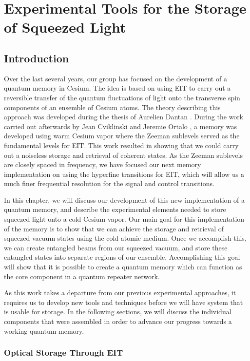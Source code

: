 \chapter{Experimental Tools for the Storage of Squeezed Light}
\minitoc

 
\section{Introduction}

Over the last several years, our group has focused on the development of a quantum memory in Cesium.  The idea is based on using EIT to carry out a reversible transfer of the quantum fluctuations of light onto the transverse spin components of an ensemble of Cesium atoms.  The theory describing this approach was developed during the thesis of Aurelien Dantan \cite{DantanPhD}.  During the work carried out afterwards by Jean Cviklinski \cite{CviklinskiPhD} and Jeremie Ortalo \cite{ortalo}, a memory was developed using warm Cesium vapor where the Zeeman sublevels served as the fundamental levels for EIT.  This work resulted in showing that we could carry out a noiseless storage and retrieval of coherent states.  As the Zeeman sublevels are closely spaced in frequency, we have focused our next memory implementation on using the hyperfine transitions for EIT, which will allow us a much finer frequential resolution for the signal and control transitions.

In this chapter, we will discuss our development of this new implementation of
a quantum memory, and describe the experimental elements needed to store
squeezed light onto a cold Cesium vapor.  Our main goal for this
implementation of the memory is to show that we can achieve the storage and
retrieval of squeezed vacuum states using the cold atomic medium.  Once we
accomplish this, we can create entangled beams from our squeezed vacuum, and
store these entangled states into separate regions of our ensemble.
Accomplishing this goal will show that it is possible to create a quantum memory which can function as the core component in a quantum repeater network. 

As this work takes a departure from our previous experimental approaches, it requires us to develop new tools and techniques before we will have system that is usable for storage.  In the following sections, we will discuss the individual components that were assembled in order to advance our progress towards a working quantum memory.

\subsection{Optical Storage Through EIT} 

